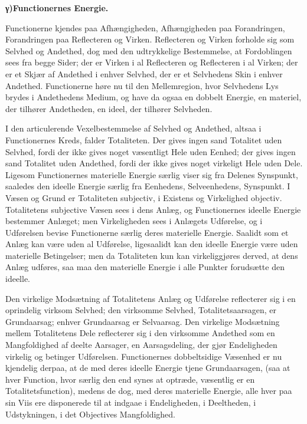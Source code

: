 \documentclass[12pt]{book}
\newcommand{\opage}[1]{\marginnote{\footnotesize\textit{[#1]}}}
\begin{document}
\begin{center}{\bfseries γ)\quad Functionernes Energie.}\end{center}

Functionerne kjendes paa Afhængigheden, Afhængigheden paa Forandringen, Forandringen paa Reflecteren
og Virken. Reflecteren og Virken forholde sig som Selvhed og Andethed, dog med den udtrykkelige
Bestemmelse, at Fordoblingen sees fra begge Sider; der er Virken i al Reflecteren og Reflecteren i al
Virken; der er et Skjær af Andethed i enhver Selvhed, der er et Selvhedens Skin i enhver Andethed.
Functionerne høre nu til den Mellemregion, hvor Selvhedens Lys brydes i Andethedens Medium, og have
da ogsaa en dobbelt Energie, en materiel, der tilhører Andetheden, en ideel, der tilhører Selvheden.

I den articulerende Vexelbestemmelse af Selvhed og
\opage{428} Andethed, altsaa i Functionernes Kreds, falder Totaliteten. Der gives ingen sand Totalitet uden
Selvhed, fordi der ikke gives noget væsentligt Hele uden Eenhed; der gives ingen sand Totalitet uden
Andethed, fordi der ikke gives noget virkeligt Hele uden Dele. Ligesom Functionernes materielle
Energie særlig viser sig fra Delenes Synspunkt, saaledes den ideelle Energie særlig fra Eenhedens,
Selveenhedens, Synspunkt. I Væsen og Grund er Totaliteten subjectiv, i Existens og Virkelighed
objectiv. Totalitetens subjective Væsen sees i dens Anlæg, og Functionernes ideelle Energie bestemmer
Anlæget; men Virkeligheden sees i Anlægets Udførelse, og i Udførelsen bevise Functionerne særlig
deres materielle Energie. Saalidt som et Anlæg kan være uden al Udførelse, ligesaalidt kan den ideelle
Energie være uden materielle Betingelser; men da Totaliteten kun kan virkeliggjøres derved, at dens
Anlæg udføres, saa maa den materielle Energie i alle Punkter forudsætte den ideelle.

Den virkelige Modsætning af Totalitetens Anlæg og Udførelse reflecterer sig i en oprindelig virksom
Selvhed; den virksomme Selvhed, Totalitetsaarsagen, er Grundaarsag; enhver Grundaarsag er Selvaarsag.
Den virkelige Modsætning mellem Totalitetens Dele reflecterer sig i den virksomme Andethed som en
Mangfoldighed af deelte Aarsager, en Aarsagsdeling, der gjør Endeligheden virkelig og betinger
Udførelsen. Functionernes dobbeltsidige Væsenhed er nu kjendelig derpaa, at de med deres ideelle
Energie tjene Grundaarsagen, (saa at hver Function, hvor særlig den end synes at optræde, væsentlig er
en Totalitetsfunction), medens de dog, med deres materielle Energie, alle hver paa sin Viis ere
disponerede til at indgaae i Endeligheden, i Deeltheden, i Udstykningen, i det Objectives
Mangfoldighed.
\end{document}
